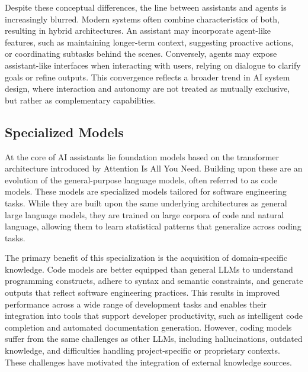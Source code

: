 Despite these conceptual differences, the line between assistants and agents is increasingly blurred. Modern systems often combine characteristics of both, resulting in hybrid architectures. An assistant may incorporate agent-like features, such as maintaining longer-term context, suggesting proactive actions, or coordinating subtasks behind the scenes. Conversely, agents may expose assistant-like interfaces when interacting with users, relying on dialogue to clarify goals or refine outputs. This convergence reflects a broader trend in AI system design, where interaction and autonomy are not treated as mutually exclusive, but rather as complementary capabilities.

\subsection{Specialized Models}
At the core of AI assistants lie foundation models based on the transformer architecture introduced by Attention Is All You Need. \cite{vaswani2017attention} Building upon these are an evolution of the general-purpose language models, often referred to as code models. These models are specialized models tailored for software engineering tasks. While they are built upon the same underlying architectures as general large language models, they are trained on large corpora of code and natural language, allowing them to learn statistical patterns that generalize across coding tasks. \cite{chen2021evaluating}

The primary benefit of this specialization is the acquisition of domain-specific knowledge. Code models are better equipped than general LLMs to understand programming constructs, adhere to syntax and semantic constraints, and generate outputs that reflect software engineering practices. This results in improved performance across a wide range of development tasks and enables their integration into tools that support developer productivity, such as intelligent code completion and automated documentation generation. \cite{chen2021evaluating ,li2022competition} However, coding models suffer from the same challenges as other LLMs, including hallucinations, outdated knowledge, and difficulties handling project-specific or proprietary contexts. \cite{ji2023survey, gao2023retrieval} These challenges have motivated the integration of external knowledge sources.

\newpage
